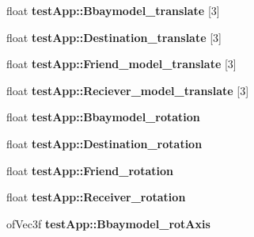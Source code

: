 \begin{DoxyCompactItemize}
\item 
\hypertarget{group___int_variables_ga7942d536f444fb86fff9209966f4723f}{float {\bfseries test\-App\-::\-Bbaymodel\-\_\-translate} \mbox{[}3\mbox{]}}\label{group___int_variables_ga7942d536f444fb86fff9209966f4723f}

\item 
\hypertarget{group___int_variables_ga7aa79456ae6088a7e83542147efd4654}{float {\bfseries test\-App\-::\-Destination\-\_\-translate} \mbox{[}3\mbox{]}}\label{group___int_variables_ga7aa79456ae6088a7e83542147efd4654}

\item 
\hypertarget{group___int_variables_ga48225d1a4e64974072bfef5ef1cbb665}{float {\bfseries test\-App\-::\-Friend\-\_\-model\-\_\-translate} \mbox{[}3\mbox{]}}\label{group___int_variables_ga48225d1a4e64974072bfef5ef1cbb665}

\item 
\hypertarget{group___int_variables_ga4d95c42aa7f2e8c9791edd84337d79d9}{float {\bfseries test\-App\-::\-Reciever\-\_\-model\-\_\-translate} \mbox{[}3\mbox{]}}\label{group___int_variables_ga4d95c42aa7f2e8c9791edd84337d79d9}

\item 
\hypertarget{group___int_variables_ga6e3a822d19aa630dd6b8f3872ebfa406}{float {\bfseries test\-App\-::\-Bbaymodel\-\_\-rotation}}\label{group___int_variables_ga6e3a822d19aa630dd6b8f3872ebfa406}

\item 
\hypertarget{group___int_variables_gaa948b9c807a0dbd468c2c5db6173d249}{float {\bfseries test\-App\-::\-Destination\-\_\-rotation}}\label{group___int_variables_gaa948b9c807a0dbd468c2c5db6173d249}

\item 
\hypertarget{group___int_variables_ga5ef2bd4ba08eedd0bb41af92deff26f7}{float {\bfseries test\-App\-::\-Friend\-\_\-rotation}}\label{group___int_variables_ga5ef2bd4ba08eedd0bb41af92deff26f7}

\item 
\hypertarget{group___int_variables_gaeab5c3c7bef4cc9aaebdd54b2f535ea4}{float {\bfseries test\-App\-::\-Receiver\-\_\-rotation}}\label{group___int_variables_gaeab5c3c7bef4cc9aaebdd54b2f535ea4}

\item 
\hypertarget{group___int_variables_ga57e7e1006c8bd2c5543c21d928e31279}{of\-Vec3f {\bfseries test\-App\-::\-Bbaymodel\-\_\-rot\-Axis}}\label{group___int_variables_ga57e7e1006c8bd2c5543c21d928e31279}


\end{DoxyCompactItemize}
